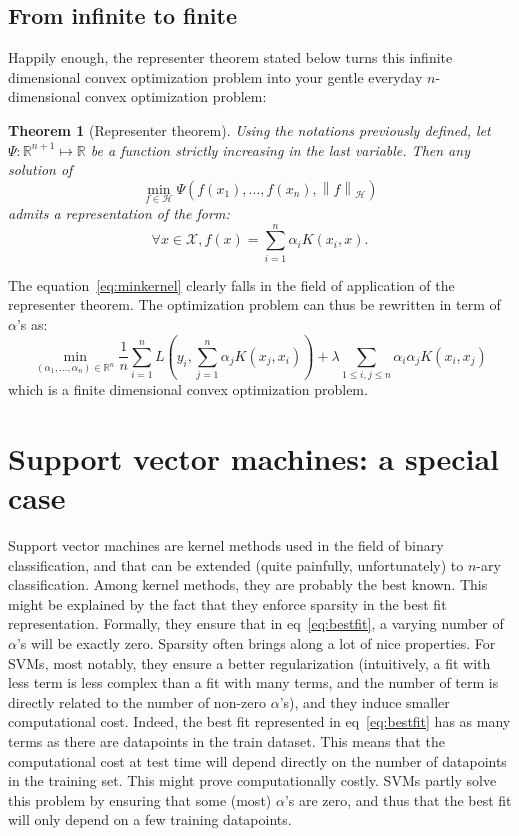\documentclass[a4paper, 11pt]{article}
\newtheorem{theorem}{Theorem}
\newcommand{\X}{\mathcal{X}}
\newcommand{\R}{\mathbb{R}}
\newcommand{\Hilb}{\mathcal{H}}
\newcommand{\x}{x_i}
\newcommand{\y}{y_i}
\newcommand{\normh}[1]{\left\| #1 \right\|_\Hilb}
\begin{document}
\subsection{From infinite to finite}
Happily enough, the representer theorem stated below turns this infinite dimensional convex optimization
problem into your gentle everyday $n$-dimensional convex optimization problem:
\begin{theorem}[Representer theorem]
  Using the notations previously defined, let $\Psi:\R^{n+1}\mapsto\R$ be a function strictly increasing in 
  the last variable. Then any solution of
  \begin{equation}
    \min\limits_{f\in\Hilb}\Psi(f(x_1), \dots, f(x_n), \normh{f})
  \end{equation}
  admits a representation of the form:
  \begin{equation}
    \forall x \in \X, f(x) = \sum\limits_{i=1}^n\alpha_iK(\x,x).
    \label{eq:bestfit}
  \end{equation}
\end{theorem}
The equation~\ref{eq:minkernel} clearly falls in the field of application of the representer theorem.
The optimization problem can thus be rewritten in term of $\alpha$'s as:
\begin{equation}
  \min\limits_{(\alpha_1, \dots, \alpha_n)\in\R^n} 
  \frac{1}{n}\sum\limits_{i=1}^nL(\y, \sum\limits_{j=1}^n\alpha_jK(x_j, x_i)) +
  \lambda\sum\limits_{1\leq i,j\leq n}\alpha_i\alpha_j K(\x, x_j)
\end{equation}
which is a finite dimensional convex optimization problem.

\section{Support vector machines: a special case\footnotemark}
Support vector machines are kernel methods used in the field of binary
classification, and that can be extended (quite painfully, unfortunately) to
$n$-ary classification.  Among kernel methods, they are probably the best
known.  This might be explained by the fact that they enforce sparsity in the
best fit representation. Formally, they ensure that in eq~\ref{eq:bestfit}, a
varying number of $\alpha$'s will be exactly zero.  Sparsity often brings along
a lot of nice properties. For SVMs, most notably, they ensure a better
regularization (intuitively, a fit with less term is less complex than a fit
with many terms, and the number of term is directly related to the number of
non-zero $\alpha$'s), and they induce smaller computational cost. Indeed, the
best fit represented in eq~\ref{eq:bestfit} has as many terms as there are
datapoints in the train dataset. This means that the computational cost at test
time will depend directly on the number of datapoints in the training set. This
might prove computationally costly. SVMs partly solve this problem by ensuring
that some (most) $\alpha$'s are zero, and thus that the best fit will only
depend on a few training datapoints. 
\end{document}
